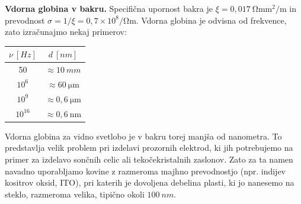 \begin{example}{\bf Vdorna globina v bakru.}
Specifična upornost bakra je $\xi = 0,017~\si{\ohm \milli\metre^2/\metre}$ in 
prevodnost $\sigma = 1/\xi = 0,7 \times 10^8/\si{\ohm\metre}$. 
Vdorna globina je odvisna od frekvence, zato izračunajmo nekaj primerov: 
\begin{center}
\begin{tabular}{|c|c|}
\hline
$\nu~[\si{Hz}]$ & $d~[\si{nm}]$\\ \hline
50 & $\approx 10~\si{mm}$\\ \hline
$10^6$ & $\approx 60~\si{\micro\metre}$\\ \hline
$10^9$ & $\approx 0,6~\si{\micro\metre}$\\ \hline
$10^{16}$ & $\approx 0,6~\si{\nano\metre}$\\ \hline
\end{tabular}
\end{center}

Vdorna globina za vidno svetlobo je v bakru torej manjša od nanometra. 
To predstavlja velik problem pri izdelavi prozornih elektrod, 
ki jih potrebujemo na primer za izdelavo sončnih celic
ali tekočekristalnih zaslonov. Zato za ta namen navadno uporabljamo
kovine z razmeroma majhno prevodnostjo (npr. indijev 
kositrov oksid, ITO), pri katerih je dovoljena debelina
plasti, ki jo nanesemo na steklo, razmeroma velika, tipično 
okoli $100~\si{nm}$. 
\end{example}
